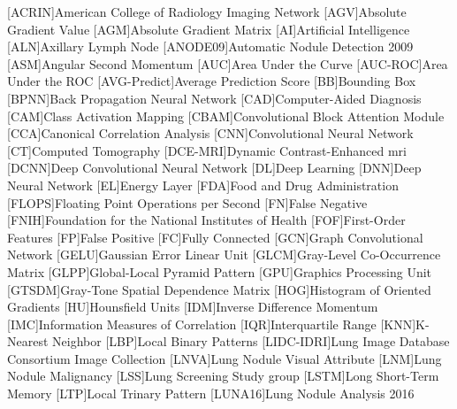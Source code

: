 \begin{flushleft}

\begin{acronym}[Abbreviations]
    [ACRIN]{American College of Radiology Imaging Network}
    [AGV]{Absolute Gradient Value}
    [AGM]{Absolute Gradient Matrix}
    [AI]{Artificial Intelligence}
    [ALN]{Axillary Lymph Node}
    [ANODE09]{Automatic Nodule Detection 2009}
    [ASM]{Angular Second Momentum}
    [AUC]{Area Under the Curve}
    [AUC-ROC]{Area Under the ROC}
    [AVG-Predict]{Average Prediction Score}
    [BB]{Bounding Box}
    [BPNN]{Back Propagation Neural Network}
    [CAD]{Computer-Aided Diagnosis}
    [CAM]{Class Activation Mapping}
    [CBAM]{Convolutional Block Attention Module}
    [CCA]{Canonical Correlation Analysis}
    [CNN]{Convolutional Neural Network}
    [CT]{Computed Tomography}
    [DCE-MRI]{Dynamic Contrast-Enhanced \ac{mri}}
    [DCNN]{Deep Convolutional Neural Network}
    [DL]{Deep Learning}
    [DNN]{Deep Neural Network}
    [EL]{Energy Layer}
    [FDA]{Food and Drug Administration}
    [FLOPS]{Floating Point Operations per Second}
    [FN]{False Negative}
    [FNIH]{Foundation for the National Institutes of Health}
    [FOF]{First-Order Features}
    [FP]{False Positive}
    [FC]{Fully Connected}
    [GCN]{Graph Convolutional Network}
    [GELU]{Gaussian Error Linear Unit}
    [GLCM]{Gray-Level Co-Occurrence Matrix}
    [GLPP]{Global-Local Pyramid Pattern}
    [GPU]{Graphics Processing Unit}
    [GTSDM]{Gray-Tone Spatial Dependence Matrix}
    [HOG]{Histogram of Oriented Gradients}
    [HU]{Hounsfield Units}
    [IDM]{Inverse Difference Momentum}
    [IMC]{Information Measures of Correlation}
    [IQR]{Interquartile Range}
    [KNN]{K-Nearest Neighbor}
    [LBP]{Local Binary Patterns}
    [LIDC-IDRI]{Lung Image Database Consortium Image Collection}
    [LNVA]{Lung Nodule Visual Attribute}
    [LNM]{Lung Nodule Malignancy}
    [LSS]{Lung Screening Study group}
    [LSTM]{Long Short-Term Memory}
    [LTP]{Local Trinary Pattern}
    [LUNA16]{Lung Nodule Analysis 2016}

\end{acronym}
\end{flushleft}
